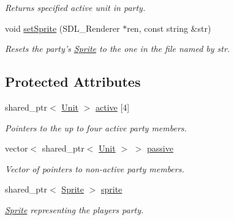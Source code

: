 \begin{DoxyCompactItemize}
\begin{DoxyCompactList}\small\item\em Returns specified active unit in party. \end{DoxyCompactList}\item 
void \hyperlink{class_party_abe069ffbbf3352f6b39246c8382dd26b}{set\+Sprite} (S\+D\+L\+\_\+\+Renderer $\ast$ren, const string \&str)\hypertarget{class_party_abe069ffbbf3352f6b39246c8382dd26b}{}\label{class_party_abe069ffbbf3352f6b39246c8382dd26b}

\begin{DoxyCompactList}\small\item\em Resets the party’s \hyperlink{class_sprite}{Sprite} to the one in the file named by str. \end{DoxyCompactList}\end{DoxyCompactItemize}
\subsection*{Protected Attributes}
\begin{DoxyCompactItemize}
\item 
shared\+\_\+ptr$<$ \hyperlink{class_unit}{Unit} $>$ \hyperlink{class_party_a6f3bc72c1b9fec43f3e82b60bb92e554}{active} \mbox{[}4\mbox{]}\hypertarget{class_party_a6f3bc72c1b9fec43f3e82b60bb92e554}{}\label{class_party_a6f3bc72c1b9fec43f3e82b60bb92e554}

\begin{DoxyCompactList}\small\item\em Pointers to the up to four active party members. \end{DoxyCompactList}\item 
vector$<$ shared\+\_\+ptr$<$ \hyperlink{class_unit}{Unit} $>$ $>$ \hyperlink{class_party_a81db9eaa6be90ce9a8bc62b4d13f5956}{passive}\hypertarget{class_party_a81db9eaa6be90ce9a8bc62b4d13f5956}{}\label{class_party_a81db9eaa6be90ce9a8bc62b4d13f5956}

\begin{DoxyCompactList}\small\item\em Vector of pointers to non-\/active party members. \end{DoxyCompactList}\item 
shared\+\_\+ptr$<$ \hyperlink{class_sprite}{Sprite} $>$ \hyperlink{class_party_ae063baa6bfa6fe247ade34a135eb3552}{sprite}\hypertarget{class_party_ae063baa6bfa6fe247ade34a135eb3552}{}\label{class_party_ae063baa6bfa6fe247ade34a135eb3552}

\begin{DoxyCompactList}\small\item\em \hyperlink{class_sprite}{Sprite} representing the player\textquotesingle{}s party. \end{DoxyCompactList}\end{DoxyCompactItemize}


